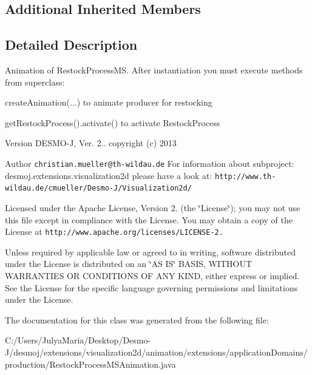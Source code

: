 \subsection*{Additional Inherited Members}


\subsection{Detailed Description}
Animation of Restock\-Process\-M\-S. After instantiation you must execute methods from superclass\-:\par
 create\-Animation(...) to animate producer for restocking\par
 get\-Restock\-Process().activate() to activate Restock\-Process

\begin{DoxyVersion}{Version}
D\-E\-S\-M\-O-\/\-J, Ver. 2.. copyright (c) 2013 
\end{DoxyVersion}
\begin{DoxyAuthor}{Author}
{\tt christian.\-mueller@th-\/wildau.\-de} For information about subproject\-: desmoj.\-extensions.\-visualization2d please have a look at\-: {\tt http\-://www.\-th-\/wildau.\-de/cmueller/\-Desmo-\/\-J/\-Visualization2d/}
\end{DoxyAuthor}
Licensed under the Apache License, Version 2. (the \char`\"{}\-License\char`\"{}); you may not use this file except in compliance with the License. You may obtain a copy of the License at {\tt http\-://www.\-apache.\-org/licenses/\-L\-I\-C\-E\-N\-S\-E-\/2.}

Unless required by applicable law or agreed to in writing, software distributed under the License is distributed on an \char`\"{}\-A\-S I\-S\char`\"{} B\-A\-S\-I\-S, W\-I\-T\-H\-O\-U\-T W\-A\-R\-R\-A\-N\-T\-I\-E\-S O\-R C\-O\-N\-D\-I\-T\-I\-O\-N\-S O\-F A\-N\-Y K\-I\-N\-D, either express or implied. See the License for the specific language governing permissions and limitations under the License. 

The documentation for this class was generated from the following file\-:\begin{DoxyCompactItemize}
\item 
C\-:/\-Users/\-Julya\-Maria/\-Desktop/\-Desmo-\/\-J/desmoj/extensions/visualization2d/animation/extensions/application\-Domains/production/Restock\-Process\-M\-S\-Animation.\-java\end{DoxyCompactItemize}
